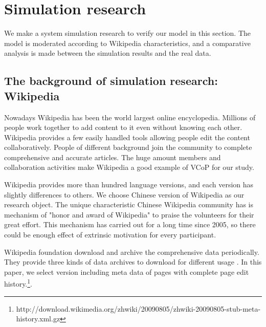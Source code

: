 \documentclass{elsarticle}
\begin{document}
\section{Simulation research }
\label{sec:simulation-research-}

 We make a system simulation research to verify our model in this section. The model
 is moderated according to
    Wikipedia characteristics, and  a comparative
    analysis is made between the simulation results and the real
    data. 

\subsection{The background of simulation research: Wikipedia}
\label{sec:backgr-simul-rese}
Nowadays Wikipedia has been the world largest online
encyclopedia. Millions of people work together to add content to it
even without knowing each other. Wikipedia provides a few easily
handled tools allowing people edit the content collaboratively. People
of different background join the community to complete comprehensive
and accurate articles. The huge amount members and collaboration
activities make Wikipedia  a good example of VCoP
for our study. 
 
Wikipedia provides more than hundred language versions, and each version
has slightly differences to others. We choose Chinese version of
Wikipedia as our research object.  The
unique characteristic Chinese Wikipedia community has is mechanism of "honor and
award of Wikipedia" to praise the volunteers for their great
effort. This mechanism  has carried out for a long time since 2005, so
there could be enough effect of extrinsic motivation for every participant. 

Wikipedia foundation download and archive the comprehensive data
periodically.  They provide three  kinds of  data archives to download
for different usage . In this paper, we select version including  meta
data of pages with complete page edit history.\footnote{http://download.wikimedia.org/zhwiki/20090805/zhwiki-20090805-stub-meta-history.xml.gz}.
   
\end{document}
